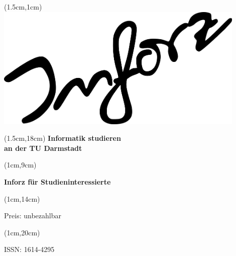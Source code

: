 \begin{titlepage}
\begin{textblock*}{12cm}(1.5cm,1cm)
\includegraphics[width=12cm]{../grafik/inforz}
\end{textblock*}


\begin{textblock*}{12cm}(1.5cm,18cm)
\centering\Huge\sffamily\textbf{
	Informatik studieren \\
	an der TU Darmstadt}
\end{textblock*}



\begin{textblock*}{5cm}(1cm,9cm)
\begin{rotate}{90}
\sffamily\huge\textbf{
	Inforz für Studieninteressierte \the\year}
\end{rotate}
\end{textblock*}


\begin{textblock*}{2cm}(1cm,14cm)
\begin{rotate}{90}
\sffamily\small Preis: unbezahlbar
\end{rotate}
\end{textblock*}


\begin{textblock*}{2cm}(1cm,20cm)
\begin{rotate}{90}
\sffamily ISSN: 1614-4295
\end{rotate}
\end{textblock*}

\end{titlepage}
\newpage